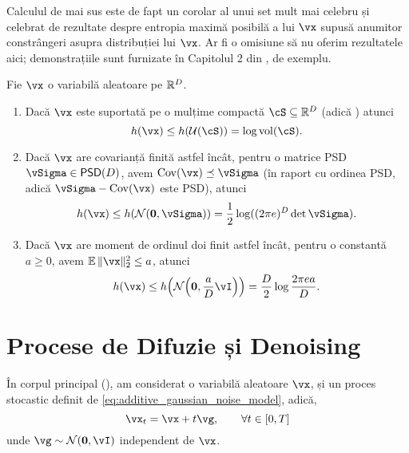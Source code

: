 \documentclass[../../book-main_ro.tex]{subfiles}
\begin{document}
Calculul de mai sus este de fapt un corolar al unui set mult mai celebru și celebrat de rezultate despre entropia maximă posibilă a lui \(\vx\) supusă anumitor constrângeri asupra distribuției lui \(\vx\). Ar fi o omisiune să nu oferim rezultatele aici; demonstrațiile sunt furnizate în Capitolul 2 din \cite{poliyanski2024information}, de exemplu.
\begin{theorem}\label{thm:max_entropy}
    Fie \(\vx\) o variabilă aleatoare pe \(\mathbb{R}^{D}\).
    \begin{enumerate}
        \item Dacă \(\vx\) este suportată pe o mulțime compactă \(\cS \subseteq \R^{D}\) (adică ) atunci
        \begin{equation}
            h(\vx) \leq h(\dUnif(\cS)) = \log \volume(\cS).
        \end{equation}
        \item Dacă \(\vx\) are covarianță finită astfel încât, pentru o matrice PSD \(\vSigma \in \PSD(D)\), avem \(\Cov(\vx) \preceq \vSigma\) (în raport cu ordinea PSD, adică \(\vSigma - \Cov(\vx)\) este PSD), atunci
        \begin{equation}
            h(\vx) \leq h(\dNorm(\vzero, \vSigma)) = \frac{1}{2}\log((2\pi e)^{D}\det\vSigma).
        \end{equation}
        \item Dacă \(\vx\) are moment de ordinul doi finit astfel încât, pentru o constantă \(a \geq 0\), avem \(\Ex\norm{\vx}_{2}^{2} \leq a\), atunci
        \begin{equation}
            h(\vx) \leq h\rp{\dNorm\rp{\vzero, \frac{a}{D}\vI}} = \frac{D}{2}\log\frac{2\pi e a}{D}.
        \end{equation}
    \end{enumerate}
\end{theorem}


\section{Procese de Difuzie și Denoising}\label{sec:entropy_diffusion}

În corpul principal (), am considerat o variabilă aleatoare \(\vx\), și un proces stocastic definit de \eqref{eq:additive_gaussian_noise_model}, adică,
\begin{equation}\label{eq:app_additive_gaussian_noise_model}
    \vx_{t} = \vx + t\vg, \qquad  \forall t \in [0, T]
\end{equation}
unde \(\vg \sim \dNorm(\vzero, \vI)\) independent de \(\vx\). 
\end{document}

